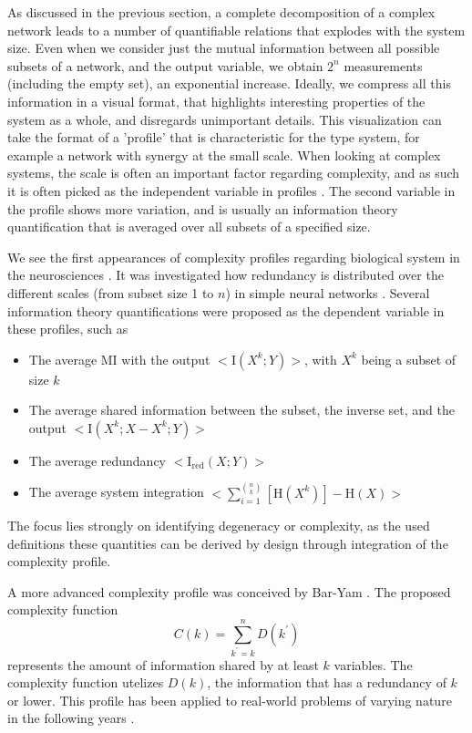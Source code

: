\documentclass[../main.tex]{subfiles}
\begin{document}
As discussed in the previous section, a complete decomposition of a complex network leads to a number of quantifiable relations that explodes with the system size.
Even when we consider just the mutual information between all possible subsets of a network, and the output variable, we obtain $2^n$ measurements (including the empty set), an exponential increase.
Ideally, we compress all this information in a visual format, that highlights interesting properties of the system as a whole, and disregards unimportant details.
This visualization can take the format of a 'profile' that is characteristic for the type system, for example a network with synergy at the small scale.
When looking at complex systems, the scale is often an important factor regarding complexity, and as such it is often picked as the independent variable in profiles \cite{bar2013computationally, quax2017quantifying, tononi1999measures}.
The second variable in the profile shows more variation, and is usually an information theory quantification that is averaged over all subsets of a specified size.

We see the first appearances of complexity profiles regarding biological system in the neurosciences \cite{}.
It was investigated how redundancy is distributed over the different scales (from subset size 1 to $n$) in simple neural networks \cite{tononi1999measures}. 
Several information theory quantifications were proposed as the dependent variable in these profiles, such as
%
\begin{itemize}
\item The average MI with the output $<\mathrm{I}(X^k;Y)>$, with $X^k$ being a subset of size $k$
\item The average shared information between the subset, the inverse set, and the output  $<\mathrm{I}(X^k;X - X^k;Y)>$
\item The average redundancy $<\mathrm{I}_\mathrm{red}(X;Y)>$
\item The average system integration $<\sum_{i = 1}^{\binom{n}{k}}[\mathrm{H}(X^k)] - \mathrm{H}(X)>$
\end{itemize}
%
The focus lies strongly on identifying degeneracy or complexity, as the used definitions these quantities can be derived by design through integration of  the complexity profile.

A more advanced complexity profile was conceived by Bar-Yam \cite{bar2004multiscale}.
The proposed complexity function
%
\begin{equation}
C(k) = \sum_{k^\prime = k}^n D(k^\prime)
\end{equation}
%
represents the amount of information shared by at least $k$ variables.
The complexity function utelizes $D(k)$, the information that has a redundancy of $k$ or lower.
This profile has been applied to real-world problems of varying nature in the following years \cite{bar2013computationally}.
\end{document}
